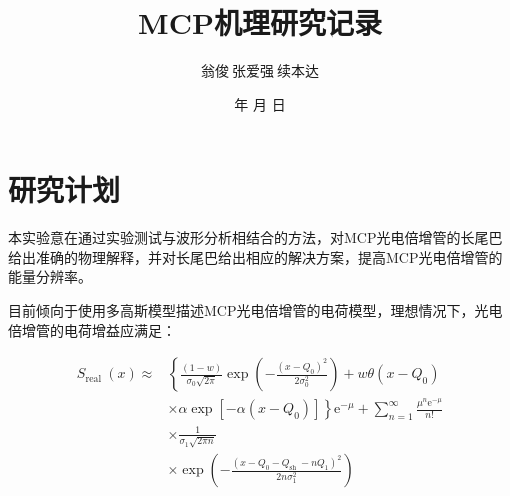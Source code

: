 \documentclass[a4paper]{article}
\begin{document}
\renewcommand{\contentsname}{目\ 录}
\renewcommand{\appendixname}{附录}
\renewcommand{\appendixpagename}{附录}
\renewcommand{\refname}{参考文献}
\renewcommand{\figurename}{图}
\renewcommand{\tablename}{表}
\renewcommand{\today}{\number\year 年 \number\month 月 \number\day 日}


\title{{\Huge MCP机理研究记录{\large\linebreak\\}}{\linebreak\linebreak}}
\author{翁俊$\  $张爱强$\  $续本达
}
\date{\today}
\maketitle
\begin{center}
    \tableofcontents\label{c}
\end{center}
\newpage


\section{研究计划} \label{overview}%
本实验意在通过实验测试与波形分析相结合的方法，对MCP光电倍增管的长尾巴给出准确的物理解释，并对长尾巴给出相应的解决方案，提高MCP光电倍增管的能量分辨率。

目前倾向于使用多高斯模型描述MCP光电倍增管的电荷模型，理想情况下，光电倍增管的电荷增益应满足\cite{1994Absolute}：

\begin{equation}
    \begin{aligned}
        S_{\text {real }}(x) \approx & \left\{\frac{(1-w)}{\sigma_0 \sqrt{2 \pi}} \exp \left(-\frac{\left(x-Q_0\right)^2}{2 \sigma_0^2}\right)+w \theta\left(x-Q_0\right)\right.         \\
                                     & \left.\times \alpha \exp \left[-\alpha\left(x-Q_0\right)\right]\right\} \mathrm{e}^{-\mu}+\sum_{n=1}^{\infty} \frac{\mu^n \mathrm{e}^{-\mu}}{n !} \\
                                     & \times \frac{1}{\sigma_1 \sqrt{2 \pi n}}                                                                                                          \\
                                     & \times \exp \left(-\frac{\left(x-Q_0-Q_{\text {sh }}-n Q_1\right)^2}{2 n \sigma_1^2}\right)
    \end{aligned}
\end{equation}
\end{document}
